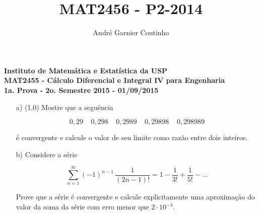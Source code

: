 \documentclass[12pt,a4paper]{article}
\title{MAT2456 - P2-2014}
\author{André Garnier Coutinho}
\begin{document}
\begin{center}
\textbf{Instituto de Matemática e Estatística da USP\\
MAT2455 - Cálculo Diferencial e Integral IV para Engenharia\\}
\textbf{1a. Prova - 2o. Semestre 2015 - 01/09/2015}
\end{center}


\begin{itemize}
	\item[a)] (1,0) Mostre que a seguência
	
	$$0,29 \;\;\;\; 0,298 \;\;\;\; 0,2989 \;\;\;\; 0,29898 \;\;\;\; 0,298989$$
	
	é convergente e calcule o valor de seu limite como razão entre dois inteiros.
	
	\item[b)] Considere a série
	
	$$\displaystyle\sum_{n=1}^\infty (-1)^{n-1} \, \frac{1}{(2n-1)!} = 1 - \frac{1}{3!} + \frac{1}{5!} - ...$$
	
    Prove que a série é convergente e calcule explicitamente uma aproximação do valor da soma da série com erro menor que $2 \cdot 10^{-4}$.
\end{itemize}
\end{document}
